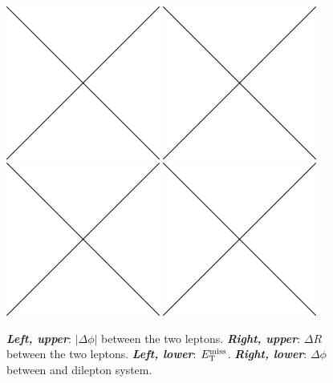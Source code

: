 \begin{figure}[!htb]
    \begin{center}
        \includegraphics[width=0.45\textwidth]{figures/placeholder}
        \includegraphics[width=0.45\textwidth]{figures/placeholder}
        \includegraphics[width=0.45\textwidth]{figures/placeholder}
        \includegraphics[width=0.45\textwidth]{figures/placeholder}
        \caption{
            \textit{\textbf{Left, upper}}: $|\Delta \phi|$ between the two leptons.
            \textit{\textbf{Right, upper}}: $\Delta R$ between the two leptons.
            \textit{\textbf{Left, lower}}: $E_{\text{T}}^{\text{miss}}$.
            \textit{\textbf{Right, lower}}: $\Delta \phi$ between \met and dilepton system.
        }
        \label{fig:hh_kin_1}
    \end{center}
\end{figure}

